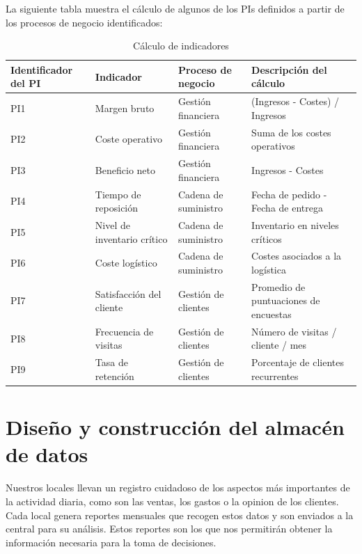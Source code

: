 \documentclass[12pt]{opticajnl}
\begin{document}
La siguiente tabla muestra el cálculo de algunos de los PIs definidos a partir de los procesos de negocio identificados:

\begin{table}[H]
\centering
\begin{tabular}{|p{2cm}|p{4cm}|p{4cm}|p{7cm}|}
\hline
\textbf{Identificador del PI} & \textbf{Indicador} & \textbf{Proceso de negocio} & \textbf{Descripción del cálculo} \\ \hline
PI1                          & Margen bruto       & Gestión financiera          & (Ingresos - Costes) / Ingresos \\ \hline
PI2                          & Coste operativo    & Gestión financiera          & Suma de los costes operativos \\ \hline
PI3                          & Beneficio neto     & Gestión financiera          & Ingresos - Costes \\ \hline
PI4                          & Tiempo de reposición & Cadena de suministro       & Fecha de pedido - Fecha de entrega \\ \hline
PI5                          & Nivel de inventario crítico & Cadena de suministro & Inventario en niveles críticos \\ \hline
PI6                          & Coste logístico    & Cadena de suministro        & Costes asociados a la logística \\ \hline
PI7                          & Satisfacción del cliente & Gestión de clientes     & Promedio de puntuaciones de encuestas \\ \hline
PI8                          & Frecuencia de visitas & Gestión de clientes       & Número de visitas / cliente / mes \\ \hline
PI9                          & Tasa de retención  & Gestión de clientes         & Porcentaje de clientes recurrentes \\ \hline
\end{tabular}
\caption{Cálculo de indicadores}
\end{table}






\section{Diseño y construcción del almacén de datos}

Nuestros locales llevan un registro cuidadoso de los aspectos más importantes de la actividad diaria, como son las ventas, los gastos o la opinion de los clientes. Cada local genera reportes mensuales que recogen estos datos y son enviados a la central para su análisis. Estos reportes son los que nos permitirán obtener la información necesaria para la toma de decisiones. 
\end{document}

